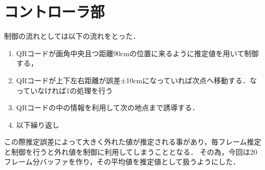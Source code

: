 \section{コントローラ部}
\label{implement_controller}
制御の流れとしては以下の流れをとった．

\begin{enumerate}
    \item QRコードが画角中央且つ距離90cmの位置に来るように推定値を用いて制御する，
    \item QRコードが上下左右距離が誤差±10cmになっていれば次点へ移動する．なっていなければ1の処理を行う
    \item QRコードの中の情報を利用して次の地点まで誘導する．
    \item 以下繰り返し
\end{enumerate}

この際推定誤差によって大きく外れた値が推定される事があり，毎フレーム推定と制御を行うと外れ値を制御に利用してしまうこととなる．
その為，今回は20フレーム分バッファを作り，その平均値を推定値として扱うようにした．